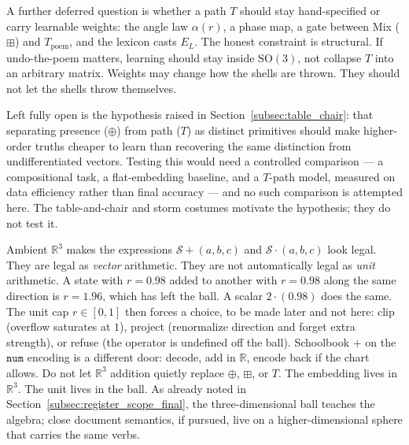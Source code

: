 \documentclass[12pt, a4paper]{article}
\begin{document}
A further deferred question is whether a path $T$ should stay
hand-specified or carry learnable weights: the angle law
$\alpha(r)$, a phase map, a gate between Mix ($\boxplus$) and
$T_{\mathrm{poem}}$, and the lexicon casts $E_L$. The honest
constraint is structural. If undo-the-poem matters, learning should
stay inside $\mathrm{SO}(3)$, not collapse $T$ into an arbitrary
matrix. Weights may change how the shells are thrown. They should
not let the shells throw themselves.

Left fully open is the hypothesis raised in
Section~\ref{subsec:table_chair}: that separating presence
($\oplus$) from path ($T$) as distinct primitives should make
higher-order truths cheaper to learn than recovering the same
distinction from undifferentiated vectors. Testing this would need a
controlled comparison --- a compositional task, a flat-embedding
baseline, and a $T$-path model, measured on data efficiency rather
than final accuracy --- and no such comparison is attempted here.
The table-and-chair and storm costumes motivate the hypothesis; they
do not test it.

Ambient $\mathbb{R}^3$ makes the expressions
$\mathcal{S}+(a,b,c)$ and $\mathcal{S}\cdot(a,b,c)$ look legal.
They are legal as \emph{vector} arithmetic. They are not automatically
legal as \emph{unit} arithmetic. A state with $r=0.98$ added to
another with $r=0.98$ along the same direction is $r=1.96$, which
has left the ball. A scalar $2\cdot(0.98)$ does the same. The unit
cap $r\in[0,1]$ then forces a choice, to be made later and not
here: clip (overflow saturates at $1$), project (renormalize
direction and forget extra strength), or refuse (the operator is
undefined off the ball). Schoolbook $+$ on the $\mathtt{num}$
encoding is a different door: decode, add in $\mathbb{R}$, encode
back if the chart allows. Do not let $\mathbb{R}^3$ addition
quietly replace $\oplus$, $\boxplus$, or $T$. The embedding
lives in $\mathbb{R}^3$. The unit lives in the ball.
As already noted in Section~\ref{subsec:register_scope_final},
the three-dimensional ball teaches the algebra; close document
semantics, if pursued, live on a higher-dimensional sphere that
carries the same verbs.
\end{document}
